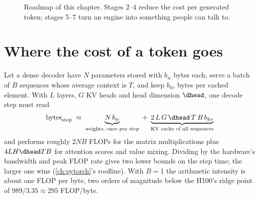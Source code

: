 \begin{figure}[t]
\centering
{}
\caption{Roadmap of this chapter. Stages 2--4 reduce the cost per generated token;
stages 5--7 turn an engine into something people can talk to.}
\label{fig:efficient:roadmap}
\end{figure}

\section{Where the cost of a token goes}\label{sec:efficient:cost}

Let a dense decoder have $N$ parameters stored with $b_w$ bytes each, serve a batch of
$B$ sequences whose average context is $T$, and keep $b_{kv}$ bytes per cached element.
With $L$ layers, $G$ KV heads and head dimension $\dhead$, one decode step must read
\begin{equation}
  \text{bytes}_{\text{step}} \;\approx\;
  \underbrace{N\,b_w}_{\text{weights, once per step}} \;+\;
  \underbrace{2\,L\,G\,\dhead\,T\,B\,b_{kv}}_{\text{KV cache of all sequences}}
  \label{eq:efficient:bytes}
\end{equation}
and performs roughly $2NB$ FLOPs for the matrix multiplications plus $4 L H \dhead T B$
for attention scores and value mixing. Dividing by the hardware's bandwidth and peak FLOP
rate gives two lower bounds on the step time; the larger one wins (\cref{ch:pytorch}'s
roofline). With $B=1$ the arithmetic intensity is about one FLOP per byte, two orders of
magnitude below the H100's ridge point of $989/3.35\approx 295$ FLOP/byte.

